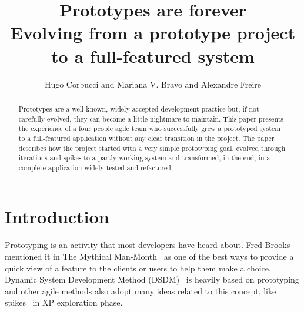 \documentclass[lnbip]{svmultln}
\begin{document}
%
\mainmatter %
%
\title{Prototypes are forever\\
  Evolving from a prototype project\\ to a full-featured system}
%
%
\author{Hugo Corbucci and Mariana V. Bravo  and
  Alexandre Freire}
%
%
%

\maketitle %

\begin{abstract} %
  Prototypes are a well known, widely accepted development practice
  but, if not carefully evolved, they can become a little nightmare to
  maintain. This paper presents the experience of a four people agile
  team who successfully grew a prototyped system to a
  full-featured application without any clear transition in the
  project. The paper describes how the project started with a very
  simple prototyping goal, evolved through iterations and spikes to a
  partly working system and transformed, in the end, in a complete
  application widely tested and refactored.

\end{abstract}
%
\section{Introduction}

Prototyping is an activity that most developers have heard about. Fred
Brooks mentioned it in The Mythical Man-Month~\cite{Brooks1975} as one
of the best ways to provide a quick view of a feature to the clients
or users to help them make a choice. Dynamic System Development Method
(DSDM)~\cite{DSDM} is heavily based on prototyping and other agile
methods also adopt many ideas related to this concept, like
spikes~\cite{XP} in XP exploration phase.
\end{document}
